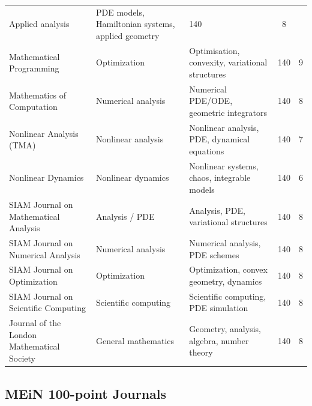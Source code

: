 \documentclass[11pt]{article}
\begin{document}
\begin{longtable}{p{4.6cm} p{3.6cm} p{4.8cm} c c}
Applied analysis &
PDE models, Hamiltonian systems, applied geometry &
140 & 8 \\
Mathematical Programming &
Optimization &
Optimisation, convexity, variational structures &
140 & 9 \\
Mathematics of Computation &
Numerical analysis &
Numerical PDE/ODE, geometric integrators &
140 & 8 \\
Nonlinear Analysis (TMA) &
Nonlinear analysis &
Nonlinear analysis, PDE, dynamical equations &
140 & 7 \\
Nonlinear Dynamics &
Nonlinear dynamics &
Nonlinear systems, chaos, integrable models &
140 & 6 \\
SIAM Journal on Mathematical Analysis &
Analysis / PDE &
Analysis, PDE, variational structures &
140 & 8 \\
SIAM Journal on Numerical Analysis &
Numerical analysis &
Numerical analysis, PDE schemes &
140 & 8 \\
SIAM Journal on Optimization &
Optimization &
Optimization, convex geometry, dynamics &
140 & 8 \\
SIAM Journal on Scientific Computing &
Scientific computing &
Scientific computing, PDE simulation &
140 & 8 \\
Journal of the London Mathematical Society &
General mathematics &
Geometry, analysis, algebra, number theory &
140 & 8 \\
\bottomrule
\end{longtable}

\subsection*{MEiN 100-point Journals}
\end{document}

